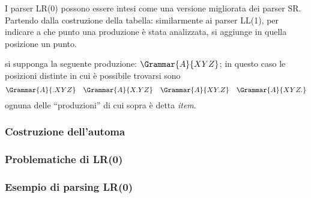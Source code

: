 \documentclass{subfiles}
\begin{document}
I parser LR(0) possono essere intesi come una versione migliorata dei parser SR.
Partendo dalla costruzione della tabella: similarmente ai parser LL(1), per indicare a che punto una produzione è stata analizzata,
si aggiunge in quella posizione un punto.

\begin{Example*}
    si supponga la seguente produzione: \(\Grammar{A}{XYZ}\);
    in questo caso le posizioni distinte in cui è possibile trovarsi sono
    \[
        \Grammar{A}{.XYZ} \quad \Grammar{A}{X.YZ} \quad \Grammar{A}{XY.Z} \quad \Grammar{A}{XYZ.}
    \]
    ognuna delle ``produzioni'' di cui sopra è detta \emph{item}.
\end{Example*}

\subsubsection{Costruzione dell'automa}


\subsubsection{Problematiche di LR(0)}


\subsubsection{Esempio di parsing LR(0)}

\clearpage
\end{document}
